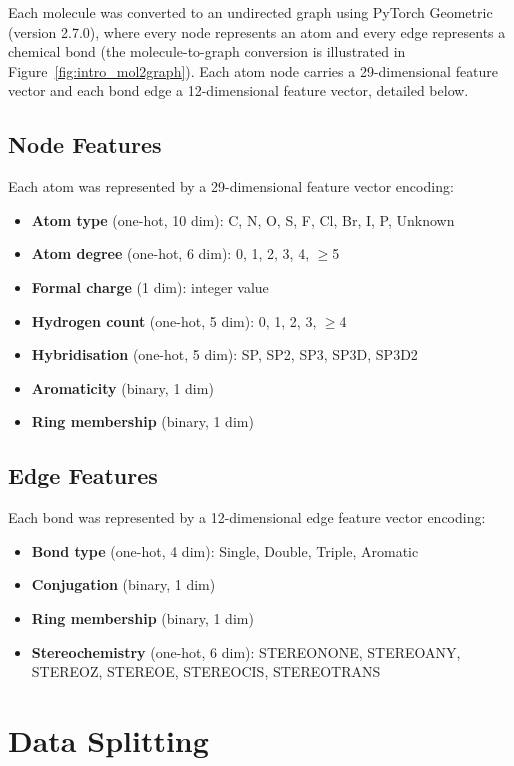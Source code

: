 Each molecule was converted to an undirected graph using
PyTorch Geometric (version 2.7.0), where every node represents an atom and every
edge represents a chemical bond (the molecule-to-graph conversion is illustrated in
Figure~\ref{fig:intro_mol2graph}). Each atom node carries a 29-dimensional feature
vector and each bond edge a 12-dimensional feature vector, detailed below.

\subsection{Node Features}

Each atom was represented by a 29-dimensional feature vector encoding:
\begin{itemize}
    \item \textbf{Atom type} (one-hot, 10 dim): C, N, O, S, F, Cl, Br, I, P, Unknown
    \item \textbf{Atom degree} (one-hot, 6 dim): 0, 1, 2, 3, 4, $\geq$5
    \item \textbf{Formal charge} (1 dim): integer value
    \item \textbf{Hydrogen count} (one-hot, 5 dim): 0, 1, 2, 3, $\geq$4
    \item \textbf{Hybridisation} (one-hot, 5 dim): SP, SP2, SP3, SP3D, SP3D2
    \item \textbf{Aromaticity} (binary, 1 dim)
    \item \textbf{Ring membership} (binary, 1 dim)
\end{itemize}

\subsection{Edge Features}

Each bond was represented by a 12-dimensional edge feature vector encoding:
\begin{itemize}
    \item \textbf{Bond type} (one-hot, 4 dim): Single, Double, Triple, Aromatic
    \item \textbf{Conjugation} (binary, 1 dim)
    \item \textbf{Ring membership} (binary, 1 dim)
    \item \textbf{Stereochemistry} (one-hot, 6 dim): STEREONONE, STEREOANY,
          STEREOZ, STEREOE, STEREOCIS, STEREOTRANS
\end{itemize}

\section{Data Splitting}

